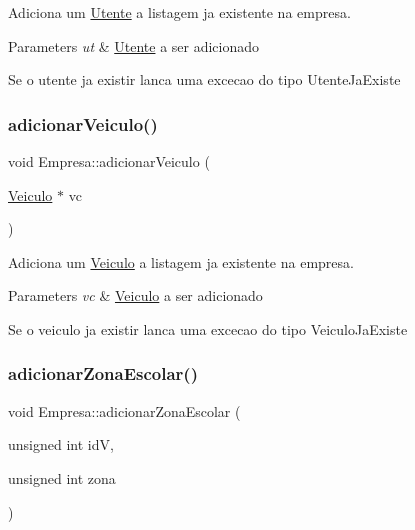 Adiciona um \mbox{\hyperlink{class_utente}{Utente}} a listagem ja existente na empresa. 


\begin{DoxyParams}{Parameters}
{\em ut} & \mbox{\hyperlink{class_utente}{Utente}} a ser adicionado\\
\hline
\end{DoxyParams}
Se o utente ja existir lanca uma excecao do tipo Utente\+Ja\+Existe \mbox{\label{class_empresa_abe88713c8f7666b9ae119700fc318d78}} 
\subsubsection{\texorpdfstring{adicionar\+Veiculo()}{adicionarVeiculo()}}
{\footnotesize\ttfamily void Empresa\+::adicionar\+Veiculo (\begin{DoxyParamCaption}\item[{\mbox{\hyperlink{class_veiculo}{Veiculo}} $\ast$}]{vc }\end{DoxyParamCaption})}



Adiciona um \mbox{\hyperlink{class_veiculo}{Veiculo}} a listagem ja existente na empresa. 


\begin{DoxyParams}{Parameters}
{\em vc} & \mbox{\hyperlink{class_veiculo}{Veiculo}} a ser adicionado\\
\hline
\end{DoxyParams}
Se o veiculo ja existir lanca uma excecao do tipo Veiculo\+Ja\+Existe \mbox{\label{class_empresa_a09c03bb10c301da04287107a1fcfd63e}} 
\subsubsection{\texorpdfstring{adicionar\+Zona\+Escolar()}{adicionarZonaEscolar()}}
{\footnotesize\ttfamily void Empresa\+::adicionar\+Zona\+Escolar (\begin{DoxyParamCaption}\item[{unsigned int}]{idV,  }\item[{unsigned int}]{zona }\end{DoxyParamCaption})}



